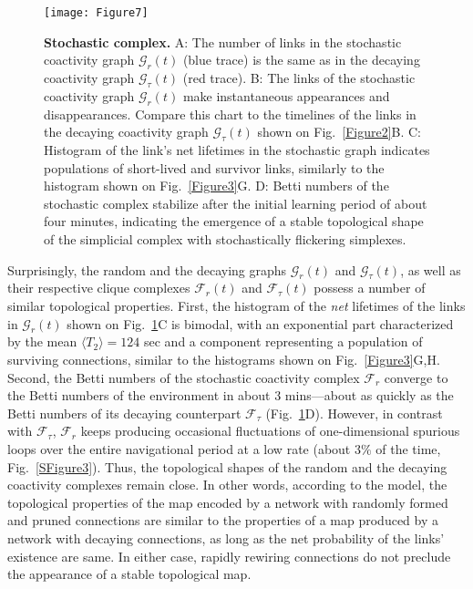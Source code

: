\documentclass[12pt,tightenlines]{revtex4}
\begin{document}
\begin{figure}[!h]
\texttt{[image: Figure7]}
\caption{{\footnotesize\textbf{Stochastic complex.} A: The number of links in the stochastic coactivity graph $\mathcal{G}_{r}(t)$ 
(blue trace) is the same as in the decaying coactivity graph $\mathcal{G}_{\tau}(t)$ (red trace). 
B: The links of the stochastic coactivity graph $\mathcal{G}_{r}(t)$ make instantaneous appearances and disappearances. 
Compare this chart to the timelines of the links in the decaying coactivity graph $\mathcal{G}_{\tau}(t)$ shown on 
Fig.~\ref{Figure2}B. %
C: Histogram of the link's net lifetimes in the stochastic graph indicates populations of short-lived and survivor links, 
similarly to the histogram shown on Fig.~\ref{Figure3}G. 
D: Betti numbers of the stochastic complex stabilize after the initial learning period of about four minutes, indicating 
the emergence of a stable topological shape of the simplicial complex with stochastically flickering simplexes.}}
\label{Figure7}
\end{figure}
Surprisingly, the random and the decaying graphs $\mathcal{G}_{r}(t)$ and $\mathcal{G}_{\tau}(t)$, as well as their 
respective clique complexes $\mathcal{F}_{r}(t)$ and $\mathcal{F}_{\tau}(t)$ possess a number of similar topological 
properties. First, the histogram of the \emph{net} lifetimes of the links in $\mathcal{G}_{r}(t)$ shown on Fig.~\ref{Figure7}C 
is bimodal, with an exponential part characterized by the mean $\langle T_2 \rangle = 124$ sec and a component 
representing a population of surviving connections, similar to the histograms shown on Fig.~\ref{Figure3}G,H. Second, the 
Betti numbers of the stochastic coactivity complex $\mathcal{F}_{r}$  converge to the Betti numbers of the environment 
in about $3$ mins---about as quickly as the Betti numbers of its decaying counterpart $\mathcal{F}_{\tau}$ (Fig.~\ref{Figure7}D). 
However, in contrast with $\mathcal{F}_{\tau}$, $\mathcal{F}_{r}$ keeps producing occasional fluctuations of one-dimensional 
spurious loops over the entire navigational period at a low rate (about $3\%$ of the time, Fig.~\ref{SFigure3}). 
Thus, the topological shapes of the random and the decaying coactivity complexes remain close. In other words, according 
to the model, the topological properties of the map encoded by a network with randomly formed and pruned 
connections are similar to the properties of a map produced by a network with decaying connections, as long 
as the net probability of the links' existence are same. In either case, rapidly rewiring connections do not preclude 
the appearance of a stable topological map.
 
\end{document}
